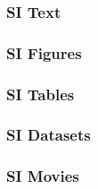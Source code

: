 \documentclass[9pt,twocolumn,twoside]{pnas-new}
\begin{document}
\subsubsection*{SI Text}


\subsubsection*{SI Figures}


\subsubsection*{SI Tables}


\subsubsection*{SI Datasets} 



\subsubsection*{SI Movies}

\end{document}
